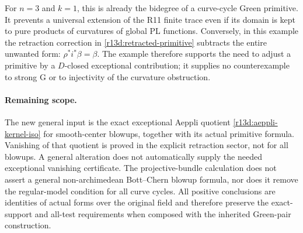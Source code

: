 For $n=3$ and $k=1$, this is already the bidegree of a curve-cycle
Green primitive.  It prevents a universal extension of the R11
finite trace even if its domain is kept to pure products of
curvatures of global PL functions.  Conversely, in this example
the retraction correction in \eqref{r13d:retracted-primitive}
subtracts the entire unwanted form: $\rho^*i^*\beta=\beta$.
The example therefore supports the need to adjust a primitive by
a $D$-closed exceptional contribution; it supplies no counterexample
to strong G or to injectivity of the curvature obstruction.

\paragraph{Remaining scope.}
The new general input is the exact exceptional Aeppli quotient
\eqref{r13d:aeppli-kernel-iso} for smooth-center blowups, together
with its actual primitive formula.  Vanishing of that quotient is
proved in the explicit retraction sector, not for all blowups.
A general alteration does not automatically supply the needed
exceptional vanishing certificate.  The projective-bundle calculation
does not assert a general non-archimedean Bott--Chern blowup formula,
nor does it remove the regular-model condition for all curve cycles.
All positive conclusions are identities of actual forms over the
original field and therefore preserve the exact-support and all-test
requirements when composed with the inherited Green-pair construction.
